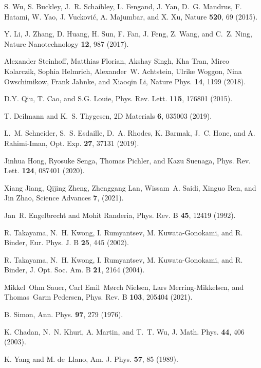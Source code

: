 \documentclass[aps,prb,superscriptaddress,letterpaper,amsmath,amssymb,twocolumn,preprintnumbers]{revtex4}
\begin{document}
\begin{thebibliography}{10}
S. Wu, S. Buckley, J.~R. Schaibley, L. Fengand, J. Yan, D.~G. Mandrus, F.
  Hatami, W. Yao, J. Vuckovi{\'{c}}, A. Majumbar, and X. Xu, Nature {\bf 520},
  69   (2015).

Y. Li, J. Zhang, D. Huang, H. Sun, F. Fan, J. Feng, Z. Wang, and C.~Z. Ning,
  Nature Nanotechnology {\bf 12},  987   (2017).

Alexander Steinhoff, Matthias Florian, Akshay Singh, Kha Tran, Mirco Kolarczik,
  Sophia Helmrich, Alexander~W. Achtstein, Ulrike Woggon, Nina Owschimikow,
  Frank Jahnke, and Xiaoqin Li, Nature Phys. {\bf 14},  1199   (2018).

D.Y. Qiu, T. Cao, and S.G. Louie, Phys. Rev. Lett. {\bf 115},  176801   (2015).

T. Deilmann and K.~S. Thygesen, 2D Materials {\bf 6},  035003  (2019).

L.~M. Schneider, S.~S. Esdaille, D.~A. Rhodes, K. Barmak, J.~C. Hone, and A.
  Rahimi-Iman, Opt. Exp. {\bf 27},  37131  (2019).

Jinhua Hong, Ryosuke Senga, Thomas Pichler, and Kazu Suenaga, Phys. Rev. Lett.
  {\bf 124},  087401  (2020).

Xiang Jiang, Qijing Zheng, Zhenggang Lan, Wissam~A. Saidi, Xinguo Ren, and Jin
  Zhao, Science Advances {\bf 7},    (2021).

Jan~R. Engelbrecht and Mohit Randeria, Phys. Rev. B {\bf 45},  12419  (1992).

R. Takayama, N.~H. Kwong, I. Rumyantsev, M. Kuwata-Gonokami, and R. Binder,
  Eur. Phys. J. B {\bf 25},  445  (2002).

R. Takayama, N.~H. Kwong, I. Rumyantsev, M. Kuwata-Gonokami, and R. Binder, J.
  Opt. Soc. Am. B {\bf 21},  2164  (2004).

Mikkel~Ohm Sauer, Carl Emil~M\o{}rch Nielsen, Lars Merring-Mikkelsen, and
  Thomas~Garm Pedersen, Phys. Rev. B {\bf 103},  205404  (2021).

B. Simon, Ann. Phys. {\bf 97},  279  (1976).

K. Chadan, N.~N. Khuri, A. Martin, and T.~T. Wu, J. Math. Phys. {\bf 44},  406
  (2003).

K. Yang and M. de~Llano, Am. J. Phys. {\bf 57},  85  (1989).


\end{thebibliography}
\end{document}
